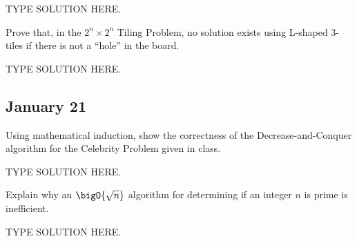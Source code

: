 \documentclass[final]{article}
\begin{document}
\begin{solution}
    TYPE SOLUTION HERE.
\end{solution}

\begin{question}
    Prove that, in the $2^n \times 2^n$ Tiling Problem, no solution exists using L-shaped 3-tiles if there is not a ``hole'' in the board.
\end{question}

\begin{solution}
    TYPE SOLUTION HERE.
\end{solution}

\subsection{January 21}
\begin{question}
    Using mathematical induction, show the correctness of the Decrease-and-Conquer algorithm for the Celebrity Problem given in class.
\end{question}

\begin{solution}
    TYPE SOLUTION HERE.
\end{solution}

\begin{question}
    Explain why an $\bigO{\sqrt{n}}$ algorithm for determining if an integer $n$ is prime is inefficient.
\end{question}

\begin{solution}
    TYPE SOLUTION HERE.
\end{solution}
\end{document}
